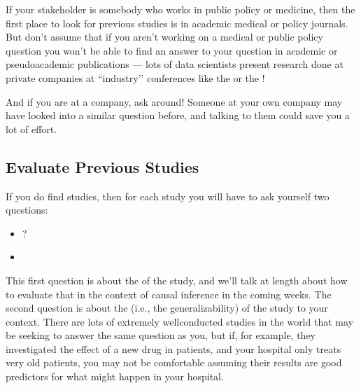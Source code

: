 \documentclass[letterpaper,10pt,english]{jupyterBook}
\begin{document}
\sphinxAtStartPar
If your stakeholder is somebody who works in public policy or medicine, then the first place to look for previous studies is in academic medical or policy journals. But don’t assume that if you aren’t working on a medical or public policy question you won’t be able to find an answer to your question in academic or pseudo\sphinxhyphen{}academic publications — lots of data scientists present research done at private companies at ``industry’’ conferences like the  or the !

\sphinxAtStartPar
And if you are at a company, ask around! Someone at your own company may have looked into a similar question before, and talking to them could save you a lot of effort.


\subsection{Evaluate Previous Studies}
\label{\detokenize{30_questions/35_using_causal_questions:evaluate-previous-studies}}
\sphinxAtStartPar
If you do find studies, then for each study you will have to ask yourself two questions:
\begin{itemize}
\item {} 
\sphinxAtStartPar
{}?

\item {} 
\sphinxAtStartPar
{}

\end{itemize}

\sphinxAtStartPar
This first question is about the  of the study, and we’ll talk at length about how to evaluate that in the context of causal inference in the coming weeks. The second question is about the  (i.e., the generalizability) of the study to your context. There are lots of extremely well\sphinxhyphen{}conducted studies in the world that may be seeking to answer the same question as you, but if, for example, they investigated the effect of a new drug in  patients, and your hospital only treats very old patients, you may not be comfortable assuming their results are good predictors for what might happen in your hospital.
\end{document}
